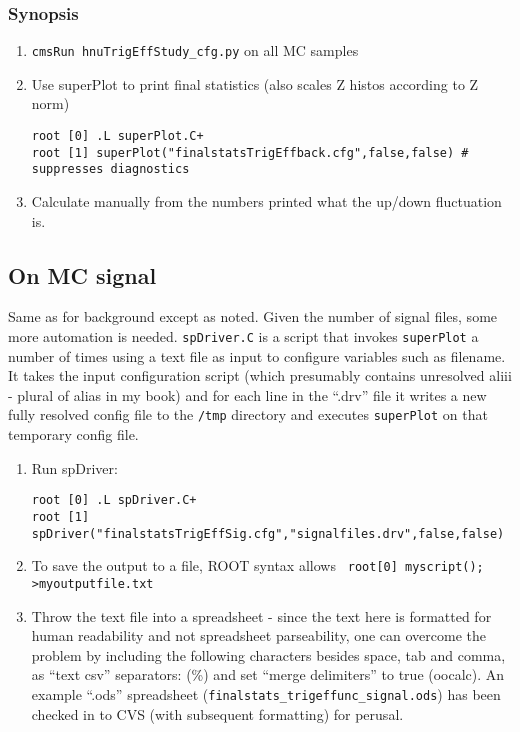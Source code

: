 \documentclass[english]{article}
\begin{document}
\subsubsection{Synopsis}
\begin{enumerate}
%
\item \verb#cmsRun hnuTrigEffStudy_cfg.py# on all MC samples
%
\item Use superPlot to print final statistics (also scales Z histos according to Z norm)
\begin{lstlisting}
root [0] .L superPlot.C+
root [1] superPlot("finalstatsTrigEffback.cfg",false,false) # suppresses diagnostics
\end{lstlisting}
%
\item Calculate manually from the numbers printed what the up/down fluctuation is.
\end{enumerate}

\subsection{On MC signal}

Same as for background except as noted. Given the number of signal
files, some more automation is needed. \verb#spDriver.C# is a script
that invokes \verb#superPlot# a number of times using a text file as
input to configure variables such as filename.  It takes the input
configuration script (which presumably contains unresolved aliii -
plural of alias in my book) and for each line in the ``.drv'' file it
writes a new fully resolved config file to the {\tt /tmp} directory
and executes \verb#superPlot# on that temporary config file.
%
\begin{enumerate}
%
\item Run spDriver:
\begin{lstlisting}
root [0] .L spDriver.C+
root [1] spDriver("finalstatsTrigEffSig.cfg","signalfiles.drv",false,false)
\end{lstlisting}
%
\item To save the output to a file, ROOT syntax allows 
\verb# root[0] myscript(); >myoutputfile.txt#
%
\item Throw the text file into a spreadsheet - since the text here is
formatted for human readability and not spreadsheet parseability, one
can overcome the problem by including the following characters besides
space, tab and comma, as ``text csv'' separators: (\%) and set ``merge
delimiters'' to true (oocalc).  An example ``.ods'' spreadsheet
(\verb#finalstats_trigeffunc_signal.ods#) has been checked in to CVS
(with subsequent formatting) for perusal.
%
\end{enumerate}
\end{document}
